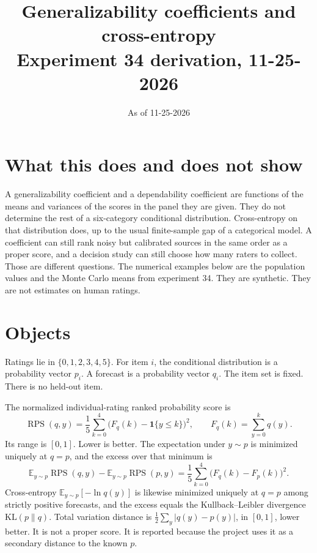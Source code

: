 \documentclass[11pt]{article}
\title{Generalizability coefficients and cross-entropy\\
\large Experiment 34 derivation, 11-25-2026}
\author{}
\date{As of 11-25-2026}
\begin{document}
\maketitle

\section*{What this does and does not show}

A generalizability coefficient and a dependability coefficient are functions of the means and variances of the scores in the panel they are given. They do not determine the rest of a six-category conditional distribution. Cross-entropy on that distribution does, up to the usual finite-sample gap of a categorical model. A coefficient can still rank noisy but calibrated sources in the same order as a proper score, and a decision study can still choose how many raters to collect. Those are different questions. The numerical examples below are the population values and the Monte Carlo means from experiment 34. They are synthetic. They are not estimates on human ratings.

\section{Objects}

Ratings lie in $\{0,1,2,3,4,5\}$. For item $i$, the conditional distribution is a probability vector $p_i$. A forecast is a probability vector $q_i$. The item set is fixed. There is no held-out item.

The normalized individual-rating ranked probability score is
\begin{equation}
\operatorname{RPS}(q,y)=\frac15\sum_{k=0}^{4}\bigl(F_q(k)-\mathbf{1}\{y\le k\}\bigr)^2,
\qquad F_q(k)=\sum_{y=0}^{k} q(y).
\end{equation}
Its range is $[0,1]$. Lower is better. The expectation under $y\sim p$ is minimized uniquely at $q=p$, and the excess over that minimum is
\begin{equation}
\mathbb{E}_{y\sim p}\operatorname{RPS}(q,y)-\mathbb{E}_{y\sim p}\operatorname{RPS}(p,y)
=\frac15\sum_{k=0}^{4}\bigl(F_q(k)-F_p(k)\bigr)^2.
\end{equation}
Cross-entropy $\mathbb{E}_{y\sim p}[-\ln q(y)]$ is likewise minimized uniquely at $q=p$ among strictly positive forecasts, and the excess equals the Kullback--Leibler divergence $\mathrm{KL}(p\|q)$. Total variation distance is $\tfrac12\sum_y|q(y)-p(y)|$, in $[0,1]$, lower better. It is not a proper score. It is reported because the project uses it as a secondary distance to the known $p$.
\end{document}

